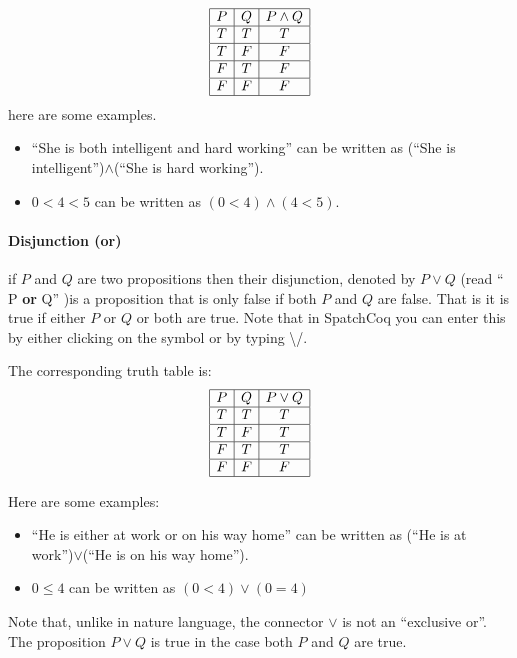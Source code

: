 $$\begin{array}{|c|c|c|}\hline P & Q & P\land Q \\\hline T & T & T \\\hline T & F & F \\\hline F & T & F \\\hline F & F & F\\ \hline\end{array}$$
here are some examples.

\begin{itemize}
\item ``She is both intelligent and hard working'' can be written as (``She is intelligent'')$\land$(``She is hard working'').
\item $0<4<5$ can be written as $(0<4)\land (4<5)$.
\end{itemize}

\paragraph{\bf Disjunction (or)}
 if $P$ and $Q$ are two propositions then their disjunction, denoted by $P\lor Q$ (read `` P {\bf or} Q'' )is a proposition that is only false if both $P$ and $Q$ are false. That is it is true if either $P$ or $Q$ or both are true.  Note that in SpatchCoq you can enter this by either clicking on the symbol or by typing \textbackslash /.
 
 The corresponding truth table is: 
 $$\begin{array}{|c|c|c|}\hline P & Q & P\lor Q \\\hline T & T & T \\\hline T & F & T \\\hline F & T & T \\\hline F & F & F\\ \hline\end{array}$$
 
 Here are some examples:

\begin{itemize}
\item ``He is either at work or on his way home'' can be written as (``He is  at work'')$\lor$(``He is on his way home'').
\item $0\le 4$ can be  written as $(0<4)\lor (0=4)$ 
\end{itemize}
Note that, unlike in nature language, the connector $\lor$ is not an ``exclusive or''. The proposition $P\lor Q$ is true in the case both $P$ and $Q$ are true.


